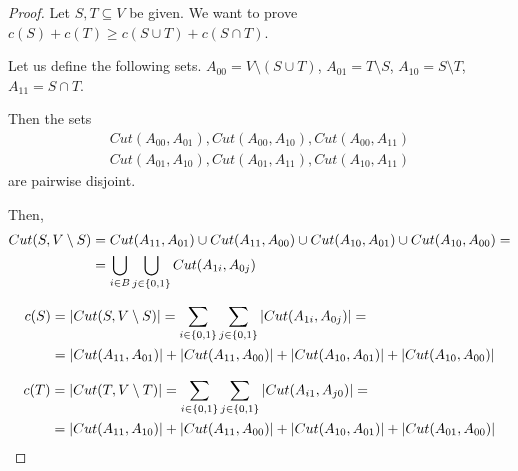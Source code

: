     \begin{proof}
        Let $S,T \subseteq V$ be given. We want to prove $c(S) + c(T) \geq c(S \cup T) + c(S \cap T)$.

        Let us define the following sets.
        $A_{00} = V \setminus (S \cup T)$, $A_{01} = T \setminus S$, $A_{10} = S \setminus T$, $A_{11} = S \cap T$.

        Then the sets
        \begin{equation*}
            \begin{split}
                Cut(A_{00}, A_{01}), Cut(A_{00}, A_{10}), Cut(A_{00}, A_{11})\\
                Cut(A_{01}, A_{10}), Cut(A_{01}, A_{11}), Cut(A_{10}, A_{11})
            \end{split}
        \end{equation*}
        are pairwise disjoint.

        Then,
        \begin{equation*}
            \begin{split}
                Cut(S, V \setminus S)  &= Cut(A_{11}, A_{01}) \cup Cut(A_{11}, A_{00}) \cup Cut(A_{10}, A_{01}) \cup Cut(A_{10}, A_{00}) = \\
                &= \bigcup_{i \in B} \bigcup_{j \in \{ 0,1 \}} Cut(A_{1i}, A_{0j})
            \end{split}
        \end{equation*}

        \begin{equation*}
            \begin{split}
                c(S) &= \vert Cut(S, V \setminus S) \vert = \sum_{i \in \{ 0,1 \}} \sum_{j \in \{ 0,1 \}} \vert Cut(A_{1i}, A_{0j}) \vert = \\
                    &= \vert Cut(A_{11}, A_{01}) \vert + \vert Cut(A_{11}, A_{00}) \vert + \vert Cut(A_{10}, A_{01}) \vert + \vert Cut(A_{10}, A_{00}) \vert
            \end{split}
        \end{equation*}

        \begin{equation*}
            \begin{split}
                c(T) &= \vert Cut(T, V \setminus T) \vert = \sum_{i \in \{ 0,1 \}} \sum_{j \in \{ 0,1 \}} \vert Cut(A_{i1}, A_{j0}) \vert = \\
                    &= \vert Cut(A_{11}, A_{10}) \vert + \vert Cut(A_{11}, A_{00}) \vert + \vert Cut(A_{10}, A_{01}) \vert + \vert Cut(A_{01}, A_{00}) \vert
            \end{split}
        \end{equation*}


\end{proof}
